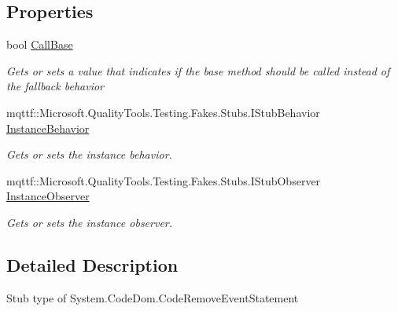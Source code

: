 \subsection*{Properties}
\begin{DoxyCompactItemize}
\item 
bool \hyperlink{class_system_1_1_code_dom_1_1_fakes_1_1_stub_code_remove_event_statement_a069374bcae26170d3d383f45d6087e81}{Call\-Base}
\begin{DoxyCompactList}\small\item\em Gets or sets a value that indicates if the base method should be called instead of the fallback behavior\end{DoxyCompactList}\item 
mqttf\-::\-Microsoft.\-Quality\-Tools.\-Testing.\-Fakes.\-Stubs.\-I\-Stub\-Behavior \hyperlink{class_system_1_1_code_dom_1_1_fakes_1_1_stub_code_remove_event_statement_ad917b15875492c370e4866310ca4da5b}{Instance\-Behavior}
\begin{DoxyCompactList}\small\item\em Gets or sets the instance behavior.\end{DoxyCompactList}\item 
mqttf\-::\-Microsoft.\-Quality\-Tools.\-Testing.\-Fakes.\-Stubs.\-I\-Stub\-Observer \hyperlink{class_system_1_1_code_dom_1_1_fakes_1_1_stub_code_remove_event_statement_a12ecb206c5be142eb11188301603d2e0}{Instance\-Observer}
\begin{DoxyCompactList}\small\item\em Gets or sets the instance observer.\end{DoxyCompactList}\end{DoxyCompactItemize}


\subsection{Detailed Description}
Stub type of System.\-Code\-Dom.\-Code\-Remove\-Event\-Statement



